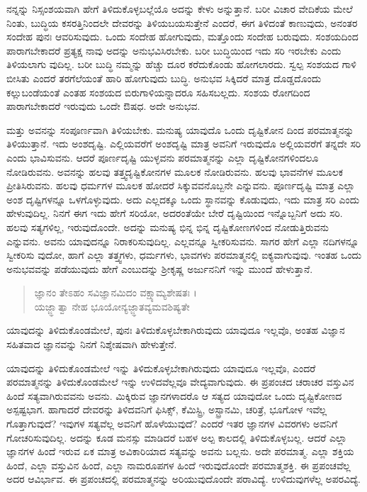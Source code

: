 ನನ್ನನ್ನು ನಿಸ್ಸಂಶಯವಾಗಿ ಹೇಗೆ ತಿಳಿದುಕೊಳ್ಳಬಲ್ಲೆಯೊ ಅದನ್ನು ಕೇಳು ಅನ್ನುತ್ತಾನೆ. ಬರೀ ವಿಚಾರ ವೇದಿಕೆಯ ಮೇಲೆ ನಿಂತು, ಬುದ್ಧಿಯ ಕಸರತ್ತಿನಿಂದಲೇ ದೇವರನ್ನು ತಿಳಿಯಬಯಸುತ್ತೇನೆ ಎಂದರೆ, ಈಗ ತಿಳಿದಂತೆ ಕಾಣುವುದು, ಅನಂತರ ಸಂದೇಹ ಪುನಃ ಆವರಿಸುವುದು. ಒಂದು ಸಂದೇಹ ಹೋಗುವುದು, ಮತ್ತೊಂದು ಸಂದೇಹ ಬರುವುದು. ಸಂಶಯದಿಂದ ಪಾರಾಗಬೇಕಾದರೆ ಪ್ರತ್ಯಕ್ಷ ನಾವು ಅದನ್ನು ಅನುಭವಿಸಿರಬೇಕು. ಬರೀ ಬುದ್ಧಿಯಿಂದ ಇದು ಸರಿ ಇರಬೇಕು ಎಂದು ತಿಳಿಯಲಾಗು ವುದಿಲ್ಲ. ಬರೀ ಬುದ್ಧಿ ನಮ್ಮನ್ನು ಹೆಚ್ಚು ದೂರ ಕರೆದುಕೊಂಡು ಹೋಗಲಾರದು. ಸ್ವಲ್ಪ ಸಂಶಯದ ಗಾಳಿ ಬೀಸಿತು ಎಂದರೆ ತರಗೆಲೆಯಂತೆ ಹಾರಿ ಹೋಗುವುದು ಬುದ್ಧಿ. ಅನುಭವ ಸಿಕ್ಕಿದರೆ ಮಾತ್ರ ದೊಡ್ಡದೊಂದು ಕಲ್ಲುಬಂಡೆಯಂತೆ ಎಂತಹ ಸಂಶಯದ ಬಿರುಗಾಳಿಯನ್ನಾದರೂ ಸಹಿಸಬಲ್ಲದು. ಸಂಶಯ ರೋಗದಿಂದ ಪಾರಾಗಬೇಕಾದರೆ ಇರುವುದು ಒಂದೇ ಔಷಧ. ಅದೇ ಅನುಭವ. 

ಮತ್ತು ಅವನನ್ನು ಸಂಪೂರ್ಣವಾಗಿ ತಿಳಿಯಬೇಕು. ಮನುಷ್ಯ ಯಾವುದೊ ಒಂದು ದೃಷ್ಟಿಕೋನ ದಿಂದ ಪರಮಾತ್ಮನನ್ನು ತಿಳಿಯುತ್ತಾನೆ. ಇದು ಅಂಶದೃಷ್ಟಿ. ಎಲ್ಲಿಯವರೆಗೆ ಅಂಶದೃಷ್ಟಿ ಮಾತ್ರ ಅವನಿಗೆ ಇರುವುದೊ ಅಲ್ಲಿಯವರೆಗೆ ತನ್ನದೇ ಸರಿ ಎಂದು ಭಾವಿಸುವನು. ಆದರೆ ಪೂರ್ಣದೃಷ್ಟಿ ಯುಳ್ಳವನು ಪರಮಾತ್ಮನನ್ನು ಎಲ್ಲಾ ದೃಷ್ಟಿಕೋನಗಳಿಂದಲೂ ನೋಡಿರುವನು. ಅವನನ್ನು ಹಲವು ತತ್ತ್ವದೃಷ್ಟಿಕೋನಗಳ ಮೂಲಕ ನೋಡಿರುವನು. ಹಲವು ಭಾವನೆಗಳ ಮೂಲಕ ಪ್ರೀತಿಸಿರುವನು. ಹಲವು ಧರ್ಮಗಳ ಮೂಲಕ ಹೋದರೆ ಸಿಕ್ಕುವವನೊಬ್ಬನೇ ಎನ್ನುವನು. ಪೂರ್ಣದೃಷ್ಟಿ ಮಾತ್ರ ಎಲ್ಲಾ ಅಂಶ ದೃಷ್ಟಿಗಳನ್ನೂ ಒಳಗೊಳ್ಳುವುದು. ಅದು ಎಲ್ಲದಕ್ಕೂ ಒಂದು ಸ್ಥಾನವನ್ನು ಕೊಡುವುದು, ಇದು ಮಾತ್ರ ಸರಿ ಎಂದು ಹೇಳುವುದಿಲ್ಲ. ನಿನಗೆ ಈಗ ಇದು ಹೇಗೆ ಸರಿಯೋ, ಅದರಂತೆಯೇ ಬೇರೆ ದೃಷ್ಟಿಯಿಂದ ಇನ್ನೊಬ್ಬನಿಗೆ ಅದು ಸರಿ. ಹಲವು ಸತ್ಯಗಳಿಲ್ಲ, ಇರುವುದೊಂದೇ. ಅದನ್ನು ಮನುಷ್ಯ ಭಿನ್ನ ಭಿನ್ನ ದೃಷ್ಟಿಕೋಣಗಳಿಂದ ನೋಡುತ್ತಿರುವನು ಎನ್ನುವನು. ಅವನು ಯಾವುದನ್ನೂ ನಿರಾಕರಿಸುವುದಿಲ್ಲ. ಎಲ್ಲವನ್ನೂ ಸ್ವೀಕರಿಸುವನು. ಸಾಗರ ಹೇಗೆ ಎಲ್ಲಾ ನದಿಗಳನ್ನೂ ಸ್ವೀಕರಿಸು ವುದೋ, ಹಾಗೆ ಎಲ್ಲಾ ತತ್ತ್ವಗಳು, ಧರ್ಮಗಳು, ಭಾವಗಳು ಪರಮಾತ್ಮನಲ್ಲಿ ಐಕ್ಯವಾಗುವುವು. ಇಂತಹ ಒಂದು ಅನುಭವವನ್ನು ಪಡೆಯುವುದು ಹೇಗೆ ಎಂಬುದನ್ನು ಶ್ರೀಕೃಷ್ಣ ಅರ್ಜುನನಿಗೆ ಇನ್ನು ಮುಂದೆ ಹೇಳುತ್ತಾನೆ.

\begin{verse}
ಜ್ಞಾನಂ ತೇಽಹಂ ಸವಿಜ್ಞಾನಮಿದಂ ವಕ್ಷ್ಯಾಮ್ಯಶೇಷತಃ ।\\ಯಜ್ಜ್ಞಾತ್ವಾ ನೇಹ ಭೂಯೋನ್ಯಜ್ಜ್ಞಾತವ್ಯಮವಶಿಷ್ಯತೇ 
\end{verse}

{\small ಯಾವುದನ್ನು ತಿಳಿದುಕೊಂಡಮೇಲೆ, ಪುನಃ ತಿಳಿದುಕೊಳ್ಳಬೇಕಾಗಿರುವುದು ಯಾವುದೂ ಇಲ್ಲವೊ, ಅಂತಹ ವಿಜ್ಞಾನ ಸಹಿತವಾದ ಜ್ಞಾನವನ್ನು ನಿನಗೆ ನಿಶ್ಶೇಷವಾಗಿ ಹೇಳುತ್ತೇನೆ.}

ಯಾವುದನ್ನು ತಿಳಿದುಕೊಂಡಮೇಲೆ ಇನ್ನು ತಿಳಿದುಕೊಳ್ಳಬೇಕಾಗಿರುವುದು ಯಾವುದೂ ಇಲ್ಲವೊ, ಎಂದರೆ ಪರಮಾತ್ಮನನ್ನು ತಿಳಿದುಕೊಂಡಮೇಲೆ ಇನ್ನು ಉಳಿದವೆಲ್ಲವೂ ವೇದ್ಯವಾಗುವುದು. ಈ ಪ್ರಪಂಚದ ಚರಾಚರ ವಸ್ತುವಿನ ಹಿಂದೆ ಸತ್ಯವಾಗಿರುವವನು ಅವನು. ಮಿಕ್ಕಿರುವ ಜ್ಞಾನಗಳಾದರೊ ಆ ಸತ್ಯದ ಯಾವುದೋ ಒಂದು ದೃಷ್ಟಿಕೋಣದ ಅಸ್ಪಷ್ಟಭಾಗ. ಹಾಗಾದರೆ ದೇವರನ್ನು ತಿಳಿದವನಿಗೆ ಫಿಸಿಕ್ಸ್, ಕೆಮಿಸ್ಟ್ರಿ, ಅಸ್ಟ್ರಾನಮಿ, ಚರಿತ್ರೆ, ಭೂಗೋಳ ಇವೆಲ್ಲ ಗೊತ್ತಾಗುವುದೆ? ಇವುಗಳ ಸತ್ಯವೆಲ್ಲ ಅವನಿಗೆ ಹೊಳೆಯುವುದೆ? ಎಂದರೆ ಇತರ ಜ್ಞಾನಗಳ ವಿವರಗಳು ಅವನಿಗೆ ಗೋಚರಿಸುವುದಿಲ್ಲ. ಅದನ್ನು ಕೂಡ ಮನಸ್ಸು ಮಾಡಿದರೆ ಬಹಳ ಅಲ್ಪ ಕಾಲದಲ್ಲಿ ತಿಳಿದುಕೊಳ್ಳಬಲ್ಲ. ಆದರೆ ಎಲ್ಲಾ ಜ್ಞಾನಗಳ ಹಿಂದೆ ಇರುವ ಏಕ ಮಾತ್ರ ಅವಿಕಾರಿಯಾದ ಸತ್ಯವನ್ನು ಅವನು ಬಲ್ಲನು. ಅದೇ ಪರಮಾತ್ಮ. ಎಲ್ಲಾ ಶಕ್ತಿಯ ಹಿಂದೆ, ಎಲ್ಲಾ ವಸ್ತುವಿನ ಹಿಂದೆ, ಎಲ್ಲಾ ನಾಮರೂಪಗಳ ಹಿಂದೆ ಇರುವುದೊಂದೇ ಪರಮಾತ್ಮಶಕ್ತಿ. ಈ ಪ್ರಪಂಚವೆಲ್ಲ ಅದರ ಆವಿರ್ಭಾವ. ಈ ಪ್ರಪಂಚದಲ್ಲಿ ಪರಮಾತ್ಮನನ್ನು ಅರಿಯುವುದೊಂದೇ ಪರಾವಿದ್ಯೆ. ಉಳಿದುವುಗಳೆಲ್ಲ ಅಪರವಿದ್ಯೆ.

